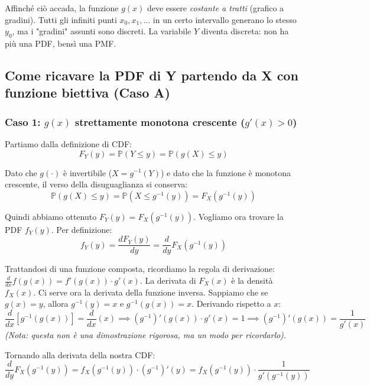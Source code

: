 Affinché ciò accada, la funzione $g(x)$ deve essere \textit{costante a tratti} (grafico a gradini). Tutti gli infiniti punti $x_0, x_1, \dots$ in un certo intervallo generano lo stesso $y_0$, ma i "gradini" assunti sono discreti. La variabile $Y$ diventa discreta: non ha più una PDF, bensì una PMF.

\subsection{Come ricavare la PDF di Y partendo da X con funzione biettiva (Caso A)}

\subsubsection*{Caso 1: $g(x)$ strettamente monotona crescente ($g'(x) > 0$)}

Partiamo dalla definizione di CDF:
\begin{equation}
F_Y(y) = \mathbb{P}(Y \le y) = \mathbb{P}(g(X) \le y)
\end{equation}

Dato che $g(\cdot)$ è invertibile ($X = g^{-1}(Y)$) e dato che la funzione è monotona crescente, il verso della disuguaglianza si conserva:
\begin{equation}
\mathbb{P}(g(X) \le y) = \mathbb{P}(X \le g^{-1}(y)) = F_X(g^{-1}(y))
\end{equation}

Quindi abbiamo ottenuto $F_Y(y) = F_X(g^{-1}(y))$. Vogliamo ora trovare la PDF $f_Y(y)$. Per definizione:
\begin{equation}
f_Y(y) = \frac{d F_Y(y)}{dy} = \frac{d}{dy} F_X(g^{-1}(y))
\end{equation}

Trattandosi di una funzione composta, ricordiamo la regola di derivazione: $\frac{d}{dx}f(g(x)) = f'(g(x)) \cdot g'(x)$. 
La derivata di $F_X(x)$ è la densità $f_X(x)$. Ci serve ora la derivata della funzione inversa.
Sappiamo che se $g(x) = y$, allora $g^{-1}(y) = x$ e $g^{-1}(g(x)) = x$. Derivando rispetto a $x$:
\begin{equation}
\frac{d}{dx}[g^{-1}(g(x))] = \frac{d}{dx}(x) \implies (g^{-1})'(g(x)) \cdot g'(x) = 1 \implies (g^{-1})'(g(x)) = \frac{1}{g'(x)}
\end{equation}
\textit{(Nota: questa non è una dimostrazione rigorosa, ma un modo per ricordarlo).}

Tornando alla derivata della nostra CDF:
\begin{equation}
\frac{d}{dy} F_X(g^{-1}(y)) = f_X(g^{-1}(y)) \cdot (g^{-1})'(y) = f_X(g^{-1}(y)) \cdot \frac{1}{g'(g^{-1}(y))}
\end{equation}

